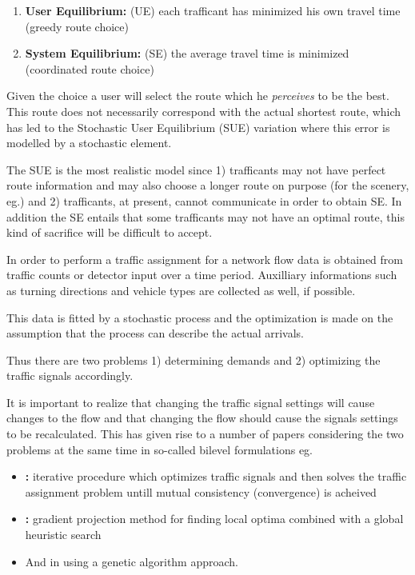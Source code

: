 \begin{enumerate}
\item \textbf{User Equilibrium:} (UE) each trafficant has minimized his own travel time (greedy route choice)
\item \textbf{System Equilibrium:} (SE) the average travel time is minimized (coordinated route choice)
\end{enumerate}

Given the choice a user will select the route which he \textit{perceives} to be the best. This route does not necessarily correspond with the actual shortest route, which has led to the Stochastic User Equilibrium (SUE) variation where this error is modelled by a stochastic element. 

The SUE is the most realistic model since 1) trafficants may not have perfect route information and may also choose a longer route on purpose (for the scenery, eg.) and 2) trafficants, at present, cannot communicate in order to obtain SE. In addition the SE entails that some trafficants may not have an optimal route, this kind of sacrifice will be difficult to accept.

In order to perform a traffic assignment for a network flow data is obtained from traffic counts or detector input over a time period. Auxilliary informations such as turning directions and vehicle types are collected as well, if possible. 

This data is fitted by a stochastic process and the optimization is made on the assumption that the process can describe the actual arrivals.

Thus there are two problems 1) determining demands and 2) optimizing the traffic signals accordingly.

It is important to realize that changing the traffic signal settings will cause changes to the flow and that changing the flow should cause the signals settings to be recalculated. This has given rise to a number of papers considering the two problems at the same time in so-called bilevel formulations eg. 
\begin{itemize}
\item \textbf{\cite{mc}:} iterative procedure which optimizes traffic signals and then solves the traffic assignment problem untill mutual consistency (convergence) is acheived
\item \textbf{\cite{34}:} gradient projection method for finding local optima combined with a global heuristic search
\item And in \textbf{\cite{2}} using a genetic algorithm approach.
\end{itemize}

